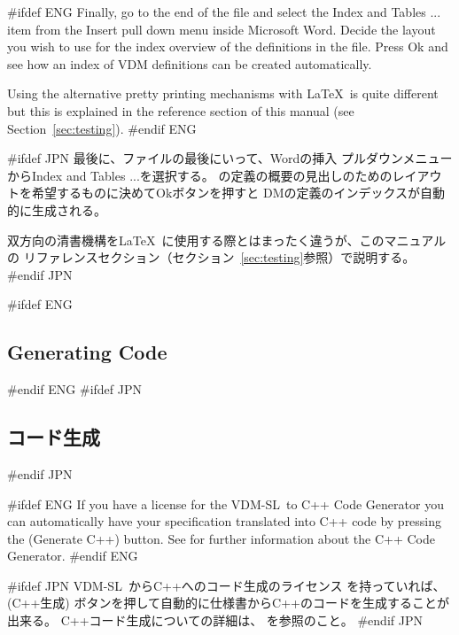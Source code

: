 \documentclass[\pformat,12pt]{article}
\newcommand{\vdmslpp}{VDM-SL}
\newcommand{\vdmslpp}{VDM++}
\newcommand{\guicmd}[1]{{\sf #1}}
\newcommand{\guicmd}[1]{{\gt #1}}
\begin{document}
#ifdef ENG
Finally, go to the end of the file and select the \guicmd{Index
and Tables ...} item from the \guicmd{Insert} pull down menu inside
Microsoft Word. Decide the layout you wish to use for the index
overview of the definitions in the  file. Press \guicmd{Ok} and see how
an index of VDM definitions can be created automatically.

Using the alternative pretty printing mechanisms with \LaTeX\ is quite
different but this is explained in the reference section of this
manual (see Section~\ref{sec:testing}).
#endif ENG

#ifdef JPN
最後に、ファイルの最後にいって、Wordの\guicmd{挿入} プルダウンメニューから\guicmd{Index
and Tables ...}を選択する。
の定義の概要の見出しのためのレイアウトを希望するものに決めて\guicmd{Ok}ボタンを押すと
DMの定義のインデックスが自動的に生成される。

双方向の清書機構を\LaTeX\ に使用する際とはまったく違うが、このマニュアルの
リファレンスセクション（セクション~\ref{sec:testing}参照）で説明する。
#endif JPN

#ifdef ENG
\subsection{Generating Code}
#endif ENG
#ifdef JPN
\subsection{コード生成}
#endif JPN

#ifdef ENG
If you have a license  for the \vdmslpp\ to C++
Code Generator you can automatically have your specification
translated into C++ code by pressing the 
(\guicmd{Generate C++}) button. See
 for further
information about the C++ Code Generator.
#endif ENG

#ifdef JPN
\vdmslpp\ からC++へのコード生成のライセンス を持っていれば、 
(\guicmd{C++生成}) ボタンを押して自動的に仕様書からC++のコードを生成することが出来る。
C++コード生成についての詳細は、
を参照のこと。
#endif JPN
\end{document}
